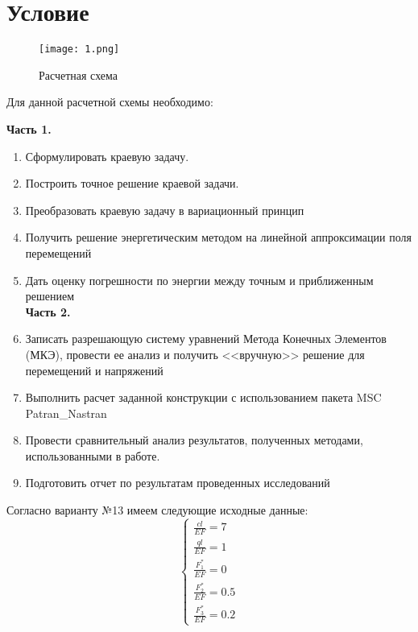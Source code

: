 \section*{Условие}

\begin{figure}[H]
    \begin{center}
        \texttt{[image: 1.png]}
        \caption*{Расчетная схема}
        \label{pic0.1}
    \end{center}
\end{figure}

Для данной расчетной схемы необходимо:

\textbf{Часть 1.}
\begin{enumerate}
    \item Сформулировать краевую задачу.
    \item Построить точное решение краевой задачи.
    \item Преобразовать краевую задачу в вариационный принцип
    \item Получить решение энергетическим методом на линейной аппроксимации поля перемещений
    \item Дать оценку погрешности по энергии между точным и приближенным решением
    \\ \textbf{Часть 2.}
    \item Записать разрешающую систему уравнений Метода Конечных Элементов (МКЭ), провести ее анализ и получить <<вручную>> решение для перемещений и напряжений
    \item Выполнить расчет заданной конструкции с использованием пакета MSC Patran\_Nastran
    \item Провести сравнительный анализ результатов, полученных методами, использованными в работе.
    \item Подготовить отчет по результатам проведенных исследований
\end{enumerate}

Согласно варианту №13 имеем следующие исходные данные:
\begin{equation}
    \label{eq0.1}
    \begin{cases}
        \displaystyle \frac{cl}{EF} = 7
        \\[10pt]
        \displaystyle \frac{ql}{EF} = 1
        \\[10pt]
        \displaystyle \frac{F_1^*}{EF} = 0
        \\[10pt]
        \displaystyle \frac{F_2^*}{EF} = 0.5
        \\[10pt]
        \displaystyle \frac{F_3^*}{EF} = 0.2
    \end{cases}
\end{equation}

